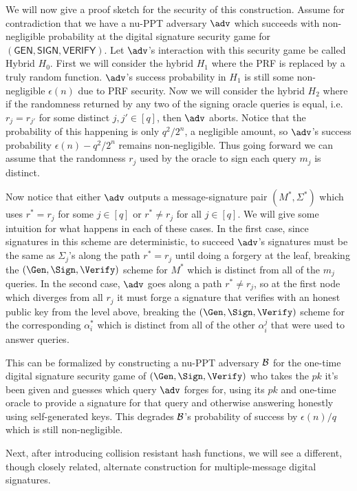 We will now give a proof sketch for the security of this construction. 
Assume for contradiction that we have a nu-PPT adversary $\adv$ which succeeds with non-negligible probability at the digital signature security game for $(\mathsf{GEN}, \mathsf{SIGN}, \mathsf{VERIFY})$. 
Let $\adv$'s interaction with this security game be called Hybrid $H_0$. 
First we will consider the hybrid $H_1$ where the PRF is replaced by a truly random function. 
$\adv$'s success probability in $H_1$ is still some non-negligible $\epsilon(n)$ due to PRF security. 
Now we will consider the hybrid $H_2$ where if the randomness returned by any two of the signing oracle queries is equal, i.e. $r_j = r_{j'}$ for some distinct $j, j' \in [q]$, then $\adv$ aborts. 
Notice that the probability of this happening is only $q^2/2^n$, a negligible amount, so $\adv$'s success probability $\epsilon(n) - q^2/2^n$ remains non-negligible. 
Thus going forward we can assume that the randomness $r_j$ used by the oracle to sign each query $m_j$ is distinct. 

Now notice that either $\adv$ outputs a message-signature pair $(M^*, \Sigma^*)$ which uses $r^* = r_j$ for some $j \in [q]$ or $r^* \not = r_j$ for all $j \in [q]$. 
We will give some intuition for what happens in each of these cases. 
In the first case, since signatures in this scheme are deterministic, to succeed $\adv$'s signatures must be the same as $\Sigma_j$'s along the path $r^* = r_j$ until doing a forgery at the leaf, breaking the $(\Gen, \Sign, \Verify)$ scheme for $M^*$ which is distinct from all of the $m_j$ queries. 
In the second case, $\adv$ goes along a path $r^* \not = r_j$, so at the first node which diverges from all $r_j$ it must forge a signature that verifies with an honest public key from the level above, breaking the $(\Gen, \Sign, \Verify)$ scheme for the corresponding $\alpha_i^*$ which is distinct from all of the other $\alpha_i^j$ that were used to answer queries. 

This can be formalized by constructing a nu-PPT adversary $\mathcal{B}$ for the one-time digital signature security game of $(\Gen, \Sign, \Verify)$ who takes the $pk$ it's been given and guesses which query $\adv$ forges for, using its $pk$ and one-time oracle to provide a signature for that query and otherwise answering honestly using self-generated keys. 
This degrades $\mathcal{B}$'s probability of success by $\epsilon(n)/q$ which is still non-negligible. 

Next, after introducing collision resistant hash functions, we will see a different, though closely related, alternate construction for multiple-message digital signatures. 


